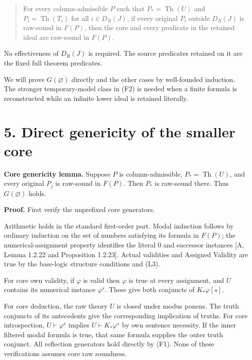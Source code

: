 \documentclass[
  11pt,
  letterpaper,
]{article}
\begin{document}
\begin{quote}
For every column-admissible \(P\) such that \(P_*=\operatorname{Th}(U)\)
and \(P_i=\operatorname{Th}(T_i)\) for all \(i\in D_R(J)\), if every
original \(P_i\) outside \(D_R(J)\) is raw-sound in \(F(P)\), then the
core and every predicate in the retained ideal are raw-sound in
\(F(P)\).
\end{quote}

No effectiveness of \(D_R(J)\) is required. The source predicates
retained on it are the fixed full theorem predicates.

We will prove \(G(\varnothing)\) directly and the other cases by
well-founded induction. The stronger temporary-model class in (F2) is
needed when a finite formula is reconstructed while an infinite lower
ideal is retained literally.

\section{5. Direct genericity of the smaller
core}\label{direct-genericity-of-the-smaller-core}

\textbf{Core genericity lemma.} Suppose \(P\) is column-admissible,
\(P_*=\operatorname{Th}(U)\), and every original \(P_j\) is raw-sound in
\(F(P)\). Then \(P_*\) is raw-sound there. Thus \(G(\varnothing)\)
holds.

\textbf{Proof.} First verify the unprefixed core generators.

Arithmetic holds in the standard first-order part. Modal induction
follows by ordinary induction on the set of numbers satisfying its
formula in \(F(P)\); the numerical-assignment property identifies the
literal \(0\) and successor instances {[}A, Lemma 1.2.22 and Proposition
1.2.23{]}. Actual validities and Assigned Validity are true by the
base-logic structure conditions and (L3).

For core own validity, if \(\varphi\) is valid then \(\varphi\) is true
at every assignment, and \(U\) contains its numerical instance
\(\varphi^s\). These give both conjuncts of \(K_*\varphi[s]\).

For core deduction, the raw theory \(U\) is closed under modus ponens.
The truth conjuncts of its antecedents give the corresponding
implication of truths. For core introspection, \(U\vdash\varphi^s\)
implies \(U\vdash K_*\varphi^s\) by own sentence necessity. If the inner
filtered modal formula is true, that same formula supplies the outer
truth conjunct. All reflection generators hold directly by (F1). None of
these verifications assumes core raw soundness.
\end{document}
